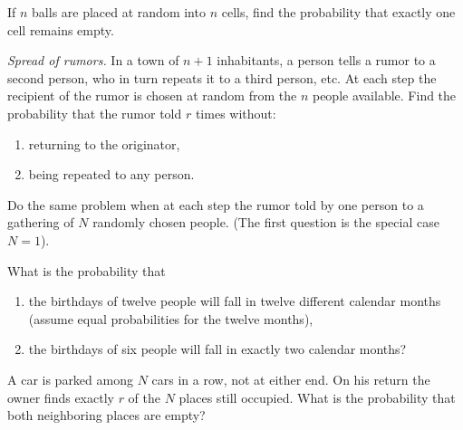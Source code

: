 \begin{problem}[Handout 2, \# 12]
  If \(n\) balls are placed at random into \(n\) cells, find the
  probability that exactly one cell remains empty.
\end{problem}
\begin{solution*}
\end{solution*}

\begin{problem}[Handout 2, \# 13]
  \emph{Spread of rumors.} In a town of \(n+1\) inhabitants, a person tells
  a rumor to a second person, who in turn repeats it to a third person,
  etc. At each step the recipient of the rumor is chosen at random from the
  \(n\) people available. Find the probability that the rumor told \(r\)
  times without:
  \begin{enumerate}[label=(\alph*),noitemsep]
  \item returning to the originator,
  \item being repeated to any person.
  \end{enumerate}
  Do the same problem when at each step the rumor told by one person to a
  gathering of \(N\) randomly chosen people. (The first question is the
  special case \(N=1\)).
\end{problem}
\begin{solution*}
\end{solution*}

\begin{problem}[Handout 2, \# 14]
  What is the probability that
  \begin{enumerate}[label=(\alph*),noitemsep]
  \item the birthdays of twelve people will fall in twelve different
    calendar months (assume equal probabilities for the twelve months),
  \item the birthdays of six people will fall in exactly two calendar
    months?
  \end{enumerate}
\end{problem}
\begin{solution*}
\end{solution*}

\begin{problem}[Handout 2, \# 15]
  A car is parked among \(N\) cars in a row, not at either end. On his
  return the owner finds exactly \(r\) of the \(N\) places still
  occupied. What is the probability that both neighboring places are empty?
\end{problem}
\begin{solution*}
\end{solution*}

